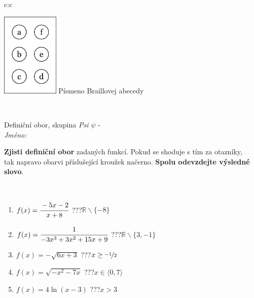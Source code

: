 \documentclass[10pt]{report}
\begin{document}
\begin{tabular}{c:c}
\begin{minipage}[c][104.5mm][t]{0.5\linewidth}
\begin{center}
\begin{minipage}{0.20\linewidth}
\begin{center}
\includegraphics[height=40mm]{../images/braille.png}
{\small Písmeno Braillovej abecedy}
\end{center}
\end{minipage}
\end{center}
\end{minipage}
\\ \hdashline
\begin{minipage}[c][104.5mm][t]{0.5\linewidth}
\begin{center}
\vspace{7mm}
{\huge Definiční obor, skupina \textit{Psi $\psi$} -}\\[5mm]
\textit{Jméno:}\phantom{xxxxxxxxxxxxxxxxxxxxxxxxxxxxxxxxxxxxxxxxxxxxxxxxxxxxxxxxxxxxxxxxx}\\[5mm]
\begin{minipage}{0.95\linewidth}
\begin{center}
\textbf{Zjisti definiční obor} zadaných funkcí. Pokud se shoduje s tím za otazníky,\\tak napravo obarvi příslušející kroužek načerno. \textbf{Spolu odevzdejte výsledné slovo}.
\end{center}
\end{minipage}
\\[1mm]
\begin{minipage}{0.79\linewidth}
\begin{center}
\begin{varwidth}{\linewidth}
\begin{enumerate}
\normalsizerrr
\item $f(x)=\cfrac{-5x-2}{x+8}$\quad \dotfill\; ???\;\dotfill \quad $\mathbb{R}\smallsetminus\{-8\}$
\item $f(x)=\cfrac{1}{-3x^3+3x^2+15x+9}$\quad \dotfill\; ???\;\dotfill \quad $\mathbb{R}\smallsetminus\{3,-1\}$
\item $f(x)=-\sqrt{6x+3}$\quad \dotfill\; ???\;\dotfill \quad $x\geq\nicefrac{-1}{2}$
\item $f(x)=\sqrt{-x^2-7x}$\quad \dotfill\; ???\;\dotfill \quad $x\in\langle0 , 7\rangle$
\item $f(x)=4\ln{(x-3)}$\quad \dotfill\; ???\;\dotfill \quad $x>3$

\end{enumerate}
\end{varwidth}
\end{center}
\end{minipage}
\end{center}
\end{minipage}
\end{tabular}
\end{document}
